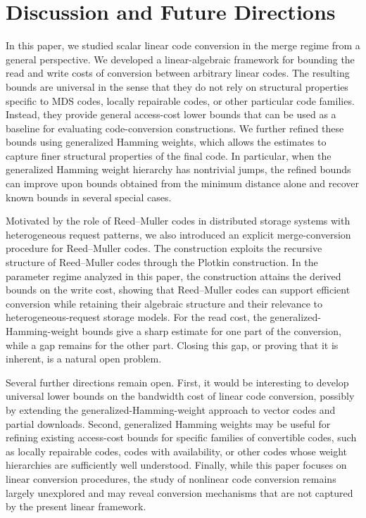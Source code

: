 \documentclass[conference, 10pt]{IEEEtran}
\theoremstyle{plain}
\theoremstyle{definition}
\begin{document}
\section{Discussion and Future Directions}\label{sec:concl}
In this paper, we studied scalar linear code conversion in the merge regime from a general perspective. We developed a linear-algebraic framework for bounding the read and write costs of conversion between arbitrary linear codes. The resulting bounds are universal in the sense that they do not rely on structural properties specific to MDS codes, locally repairable codes, or other particular code families. Instead, they provide general access-cost lower bounds that can be used as a baseline for evaluating code-conversion constructions. We further refined these bounds using generalized Hamming weights, which allows the estimates to capture finer structural properties of the final code. In particular, when the generalized Hamming weight hierarchy has nontrivial jumps, the refined bounds can improve upon bounds obtained from the minimum distance alone and recover known bounds in several special cases.

Motivated by the role of Reed--Muller codes in distributed storage systems with heterogeneous request patterns, we also introduced an explicit merge-conversion procedure for Reed--Muller codes. The construction exploits the recursive structure of Reed--Muller codes through the Plotkin construction. In the parameter regime analyzed in this paper, the construction attains the derived bounds on the write cost, showing that Reed--Muller codes can support efficient conversion while retaining their algebraic structure and their relevance to heterogeneous-request storage models. For the read cost, the generalized-Hamming-weight bounds give a sharp estimate for one part of the conversion, while a gap remains for the other part. Closing this gap, or proving that it is inherent, is a natural open problem.

Several further directions remain open. First, it would be interesting to develop universal lower bounds on the bandwidth cost of linear code conversion, possibly by extending the generalized-Hamming-weight approach to vector codes and partial downloads. Second, generalized Hamming weights may be useful for refining existing access-cost bounds for specific families of convertible codes, such as locally repairable codes, codes with availability, or other codes whose weight hierarchies are sufficiently well understood. Finally, while this paper focuses on linear conversion procedures, the study of nonlinear code conversion remains largely unexplored and may reveal conversion mechanisms that are not captured by the present linear framework.


\balance
\sloppy
\printbibliography
\end{document}
